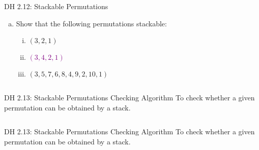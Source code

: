 \begin{frame}{}
  \begin{exampleblock}{DH 2.12: Stackable Permutations}
    \begin{enumerate}[(a)]
      \item Show that the following permutations \emph{} stackable:
	\begin{enumerate}[(i)]
	  \item $(3, 2, 1)$
	  \item \textcolor{purple}{$(3, 4, 2, 1)$}
	  \item $(3, 5, 7, 6, 8, 4, 9, 2, 10, 1)$
	\end{enumerate}
    \end{enumerate}
  \end{exampleblock}

  \pause
  \vspace{0.50cm}
  \begin{columns}
  \end{columns}
\end{frame}

\begin{frame}{}
  \begin{exampleblock}{DH 2.13: Stackable Permutations Checking Algorithm}
    To check whether a given permutation can be obtained by a stack.
  \end{exampleblock}

  \vspace{0.50cm}
  \begin{columns}
      
  \end{columns}

  \pause
  \vspace{0.60cm}
  \begin{center}
  \end{center}
\end{frame}

\begin{frame}{}
  \begin{exampleblock}{DH 2.13: Stackable Permutations Checking Algorithm}
    To check whether a given permutation can be obtained by a stack.
  \end{exampleblock}

  \vspace{0.50cm}
  \begin{columns}
      
  \end{columns}
\end{frame}

